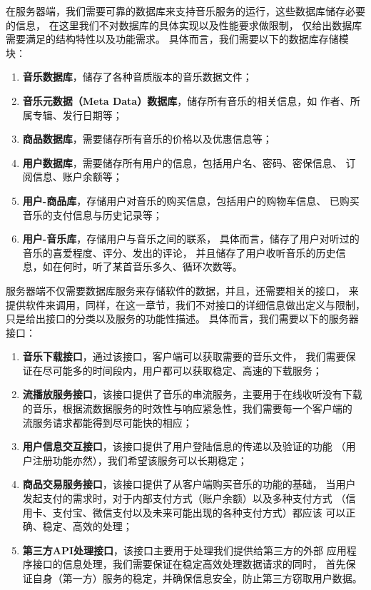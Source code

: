 在服务器端，我们需要可靠的数据库来支持音乐服务的运行，这些数据库储存必要的信息，
    在这里我们不对数据库的具体实现以及性能要求做限制，
    仅给出数据库需要满足的结构特性以及功能需求。
具体而言，我们需要以下的数据库存储模块：
    \begin{enumerate}
        \item \textbf{音乐数据库}，储存了各种音质版本的音乐数据文件；
        \item \textbf{音乐元数据（Meta Data）数据库}，储存所有音乐的相关信息，如
            作者、所属专辑、发行日期等；
        \item \textbf{商品数据库}，需要储存所有音乐的价格以及优惠信息等；
        \item \textbf{用户数据库}，需要储存所有用户的信息，包括用户名、密码、密保信息、
            订阅信息、账户余额等；
        \item \textbf{用户-商品库}，存储用户对音乐的购买信息，包括用户的购物车信息、
            已购买音乐的支付信息与历史记录等；
        \item \textbf{用户-音乐库}，存储用户与音乐之间的联系，
            具体而言，储存了用户对听过的音乐的喜爱程度、评分、发出的评论，
            并且储存了用户收听音乐的历史信息，如在何时，听了某首音乐多久、循环次数等。
    \end{enumerate}

服务器端不仅需要数据库服务来存储软件的数据，并且，还需要相关的接口，
    来提供软件来调用，同样，在这一章节，我们不对接口的详细信息做出定义与限制，
    只是给出接口的分类以及服务的功能性描述。
具体而言，我们需要以下的服务器接口：
\begin{enumerate}
    \item \textbf{音乐下载接口}，通过该接口，客户端可以获取需要的音乐文件，
        我们需要保证在尽可能多的时间段内，用户都可以获取稳定、高速的下载服务；
    \item \textbf{流播放服务接口}，该接口提供了音乐的串流服务，主要用于在线收听没有下载
        的音乐，根据流数据服务的时效性与响应紧急性，我们需要每一个客户端的
        流服务请求都能得到尽可能快的相应；
    \item \textbf{用户信息交互接口}，该接口提供了用户登陆信息的传递以及验证的功能
        （用户注册功能亦然），我们希望该服务可以长期稳定；
    \item \textbf{商品交易服务接口}，该接口提供了从客户端购买音乐的功能的基础，
        当用户发起支付的需求时，对于内部支付方式（账户余额）以及多种支付方式
        （信用卡、支付宝、微信支付以及未来可能出现的各种支付方式）都应该
        可以正确、稳定、高效的处理；
    \item \textbf{第三方API处理接口}，该接口主要用于处理我们提供给第三方的外部
        应用程序接口的信息处理，我们需要保证在稳定高效处理数据请求的同时，
        首先保证自身（第一方）服务的稳定，并确保信息安全，防止第三方窃取用户数据。
\end{enumerate}



